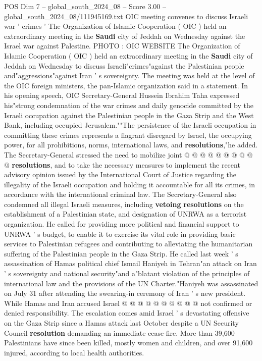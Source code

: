 \begin{textsample}{POS Dim 7 – global\_south\_2024\_08 – Score 3.00 – global\_south\_2024\_08/111945169.txt}  \label{ex:f7_pos_070}
OIC meeting convenes to discuss Israeli war ' crimes ' The Organization of Islamic Cooperation ( OIC ) held an extraordinary meeting in the \textbf{Saudi} city of Jeddah on Wednesday against the Israel war against Palestine.
PHOTO : OIC WEBSITE The Organization of Islamic Cooperation ( OIC ) held an extraordinary meeting in the \textbf{Saudi} city of Jeddah on Wednesday to discuss Israeli"crimes"against the Palestinian people and"aggressions"against Iran ' s sovereignty.
The meeting was held at the level of the OIC foreign ministers, the pan-Islamic organization said in a statement.
In his opening speech, OIC Secretary-General Hussein Ibrahim Taha expressed his"strong condemnation of the war crimes and daily genocide committed by the Israeli occupation against the Palestinian people in the Gaza Strip and the West Bank, including occupied Jerusalem.""The persistence of the Israeli occupation in committing these crimes represents a flagrant disregard by Israel, the occupying power, for all prohibitions, norms, international laws, and \textbf{resolutions},"he added.
The Secretary-General stressed the need to mobilize joint @ @ @ @ @ @ @ @ @ @ \textbf{resolutions}, and to take the necessary measures to implement the recent advisory opinion issued by the International Court of Justice regarding the illegality of the Israeli occupation and holding it accountable for all its crimes, in accordance with the international criminal law.
The Secretary-General also condemned all illegal Israeli measures, including \textbf{vetoing} \textbf{resolutions} on the establishment of a Palestinian state, and designation of UNRWA as a terrorist organization.
He called for providing more political and financial support to UNRWA ' s budget, to enable it to exercise its vital role in providing basic services to Palestinian refugees and contributing to alleviating the humanitarian suffering of the Palestinian people in the Gaza Strip.
He called last week ' s assassination of Hamas political chief Ismail Haniyeh in Tehran"an attack on Iran ' s sovereignty and national security"and a"blatant violation of the principles of international law and the provisions of the UN Charter."Haniyeh was assassinated on July 31 after attending the swearing-in ceremony of Iran ' s new president.
While Hamas and Iran accused Israel @ @ @ @ @ @ @ @ @ @ not confirmed or denied responsibility.
The escalation comes amid Israel ' s devastating offensive on the Gaza Strip since a Hamas attack last October despite a UN Security Council \textbf{resolution} demanding an immediate cease-fire.
More than 39,600 Palestinians have since been killed, mostly women and children, and over 91,600 injured, according to local health authorities.

\end{textsample}
